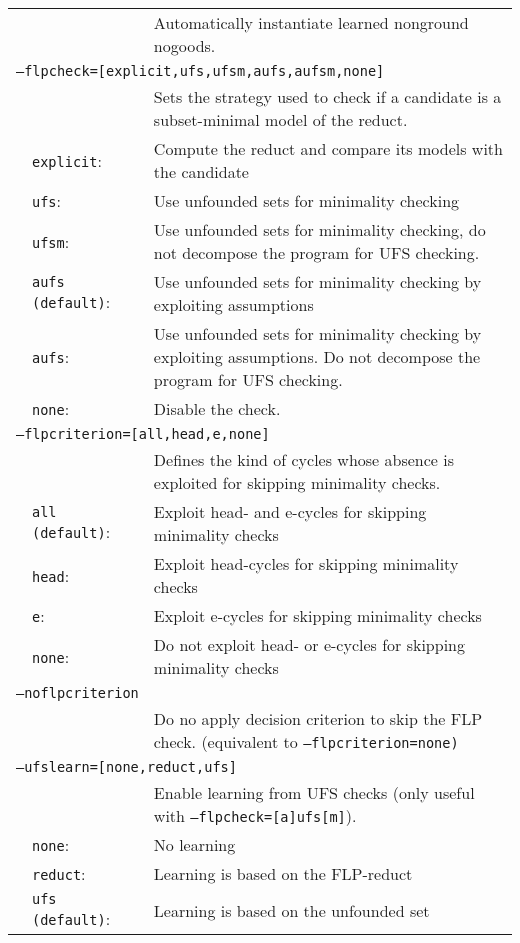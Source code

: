 \documentclass[a4paper, titlepage]{article}
\begin{document}
\begin{center}
\begin{longtable}{p{0.7cm}  p{2.2cm} p{0.3cm} p{6.3cm}  }
& & &Automatically instantiate learned nonground nogoods.\\
\multicolumn{4}{l}{\texttt{--flpcheck=[explicit,ufs,ufsm,aufs,aufsm,none]}}\\
& & &Sets the strategy used to check if a candidate is a subset-minimal model of the reduct.\\
&\texttt{explicit}:&&Compute the reduct and compare its models with the candidate\\
&\texttt{ufs}:&&Use unfounded sets for minimality checking
\\
&\texttt{ufsm}:&&Use unfounded sets for minimality checking, do not decompose the program for UFS checking.\\
&\texttt{aufs (default)}:&&Use unfounded sets for minimality checking by exploiting assumptions\\
&\texttt{aufs}:&&Use unfounded sets for minimality checking by exploiting assumptions. Do not decompose the program for UFS checking.\\
&\texttt{none}:&&Disable the check.\\
\multicolumn{4}{l}{\texttt{--flpcriterion=[all,head,e,none]}}\\
& & & Defines the kind of cycles whose absence is exploited for skipping minimality checks.\\
&\texttt{all (default)}:&&Exploit head- and e-cycles for skipping minimality checks\\
&\texttt{head}:&& Exploit head-cycles for skipping minimality checks\\
&\texttt{e}:&&Exploit e-cycles for skipping minimality checks\\
&\texttt{none}:&& Do not exploit head- or e-cycles for skipping minimality checks\\
\multicolumn{4}{l}{\texttt{--noflpcriterion}}\\
& & & Do no apply decision criterion to skip the FLP check. (equivalent to \texttt{--flpcriterion=none)}\\
\multicolumn{4}{l}{\texttt{--ufslearn=[none,reduct,ufs]}}\\
& & & Enable learning from UFS checks (only useful with \texttt{--flpcheck=[a]ufs[m]}).\\
&\texttt{none}:&&No learning\\
&\texttt{reduct}:&&Learning is based on the FLP-reduct\\
&\texttt{ufs (default)}:&&Learning is based on the unfounded set\\

\end{longtable}
\end{center}
\end{document}
